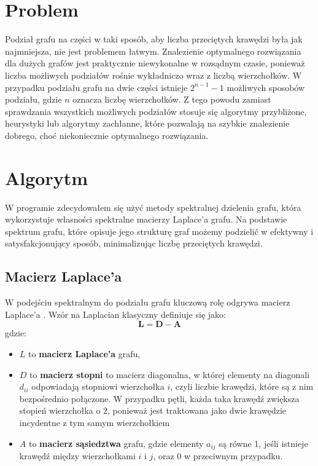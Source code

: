 \documentclass{article}
\begin{document}
\section{Problem}

    Podział grafu na części w taki sposób, aby liczba przeciętych krawędzi była jak najmniejsza, nie jest problemem łatwym. Znalezienie optymalnego rozwiązania dla dużych grafów jest praktycznie niewykonalne w rozsądnym czasie, ponieważ liczba możliwych podziałów rośnie wykładniczo wraz z liczbą wierzchołków.
    W przypadku podziału grafu na dwie części istnieje \( 2^{n-1} - 1 \) możliwych sposobów podziału, gdzie \( n \) oznacza liczbę wierzchołków. Z tego powodu zamiast sprawdzania wszystkich możliwych podziałów stosuje się algorytmy przybliżone, heurystyki lub algorytmy zachłanne, które pozwalają na szybkie znalezienie dobrego, choć niekoniecznie optymalnego rozwiązania.

\section{Algorytm}

W programie zdecydowałem się użyć metody spektralnej dzielenia grafu, która wykorzystuje własności spektralne macierzy Laplace'a grafu. Na podstawie spektrum grafu, które opisuje jego strukturę graf możemy podzielić w efektywny i satysfakcjonujący sposób, minimalizując liczbę przeciętych krawędzi.


    \subsection{Macierz Laplace'a}
    
    W podejściu spektralnym do podziału grafu kluczową rolę odgrywa macierz Laplace'a \cite{laplacian_matrix}.
    Wzór na Laplacian klasyczny definiuje się jako:
    \[
    \mathbf{L} = \mathbf{D} - \mathbf{A}
    \]
    gdzie:
    \begin{itemize}
      \item \( L \) to \textbf{macierz Laplace'a} grafu,
      \item \( D \) to \textbf{macierz stopni} to macierz diagonalna, w której elementy na diagonali \( d_{ii} \) odpowiadają stopniowi wierzchołka \( i \), czyli liczbie krawędzi, które są z nim bezpośrednio połączone. W przypadku pętli, każda taka krawędź zwiększa stopień wierzchołka o 2, ponieważ jest traktowana jako dwie krawędzie incydentne z tym samym wierzchołkiem
      \item \( A \) to \textbf{macierz sąsiedztwa} grafu, gdzie elementy \( a_{ij} \) są równe 1, jeśli istnieje krawędź między wierzchołkami \( i \) i \( j \), oraz 0 w przeciwnym przypadku.
    \end{itemize}
\end{document}
